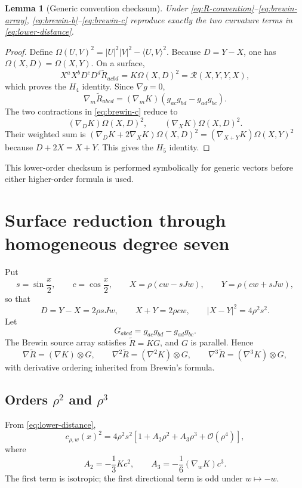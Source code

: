 \documentclass[11pt]{amsart}
\numberwithin{equation}{section}
\newtheorem{lemma}[theorem]{Lemma}
\theoremstyle{remark}
\newcommand{\Riem}{\mathcal{R}}
\newcommand{\BRiem}{\widetilde{R}}
\newcommand{\bigO}{\mathcal{O}}
\begin{document}
\begin{lemma}[Generic convention checksum]\label{lem:checksum}
Under \eqref{eq:R-convention}--\eqref{eq:brewin-array}, \eqref{eq:brewin-b}--\eqref{eq:brewin-c} reproduce exactly the two curvature terms in \eqref{eq:lower-distance}.
\end{lemma}

\begin{proof}
Define $\Omega(U,V)^2=|U|^2|V|^2-\langle U,V\rangle^2$.  Because $D=Y-X$, one has $\Omega(X,D)=\Omega(X,Y)$.  On a surface,
\[
 X^aX^bD^cD^d\BRiem_{acbd}=K\Omega(X,D)^2=\Riem(X,Y,Y,X),
\]
which proves the $H_4$ identity.  Since $\nabla g=0$,
\[
 \nabla_m\BRiem_{abcd}=(\nabla_mK)(g_{ac}g_{bd}-g_{ad}g_{bc}).
\]
The two contractions in \eqref{eq:brewin-c} reduce to
\[
 (\nabla_DK)\Omega(X,D)^2,
 \qquad
 (\nabla_XK)\Omega(X,D)^2.
\]
Their weighted sum is $(\nabla_DK+2\nabla_XK)\Omega(X,D)^2=(\nabla_{X+Y}K)\Omega(X,Y)^2$ because $D+2X=X+Y$.  This gives the $H_5$ identity.
\end{proof}

This lower-order checksum is performed symbolically for generic vectors before either higher-order formula is used.

\section{Surface reduction through homogeneous degree seven}\label{sec:surface}

Put
\[
 s=\sin\frac{x}{2},\qquad c=\cos\frac{x}{2},
 \qquad X=\rho(cw-sJw),\qquad Y=\rho(cw+sJw),
\]
so that
\begin{equation}\label{eq:XD}
 D=Y-X=2\rho sJw,
 \qquad X+Y=2\rho cw,
 \qquad |X-Y|^2=4\rho^2s^2.
\end{equation}
Let
\[
 G_{abcd}=g_{ac}g_{bd}-g_{ad}g_{bc}.
\]
The Brewin source array satisfies $\BRiem=KG$, and $G$ is parallel.  Hence
\begin{equation}\label{eq:derivative-reduction}
 \nabla\BRiem=(\nabla K)\otimes G,
 \qquad
 \nabla^2\BRiem=(\nabla^2K)\otimes G,
 \qquad
 \nabla^3\BRiem=(\nabla^3K)\otimes G,
\end{equation}
with derivative ordering inherited from Brewin's formula.

\subsection{Orders \texorpdfstring{$\rho^2$ and $\rho^3$}{rho2 and rho3}}
From \eqref{eq:lower-distance},
\begin{equation}\label{eq:A2A3}
 c_{\rho,w}(x)^2
 =4\rho^2s^2\left[1+A_2\rho^2+A_3\rho^3+\bigO(\rho^4)\right],
\end{equation}
where
\begin{equation}\label{eq:A2A3-values}
 A_2=-\frac13Kc^2,
 \qquad
 A_3=-\frac16(\nabla_wK)c^3.
\end{equation}
The first term is isotropic; the first directional term is odd under $w\mapsto-w$.
\end{document}

